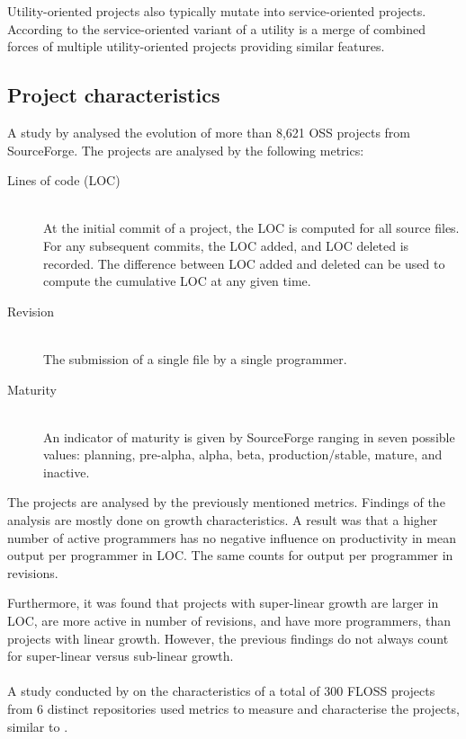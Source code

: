 Utility-oriented projects also typically mutate into service-oriented projects.
According to \citeauthor{nakakoji} the service-oriented variant of a utility is
a merge of combined forces of multiple utility-oriented projects providing
similar features.

\subsection{Project characteristics}
A study by \citet{koch2007} analysed the evolution of more than 8,621 OSS
projects from SourceForge. The projects are analysed by the following metrics:

\begin{description}
	\item[Lines of code (LOC)] \hfill \\ At the initial commit of a project,
		the LOC is computed for all source files. For any subsequent commits, the LOC
		added, and LOC deleted is recorded. The difference between LOC added and
		deleted can be used to compute the cumulative LOC at any given time.

	\item[Revision] \hfill \\ The submission of a single file by a single
		programmer.
		
	\item[Maturity] \hfill \\ An indicator of maturity is given by SourceForge
		ranging in seven possible values: planning, pre-alpha, alpha, beta,
		production/stable, mature, and inactive.
\end{description}

\noindent
The projects are analysed by the previously mentioned metrics. Findings of the
analysis are mostly done on growth characteristics. A result was that a higher
number of active programmers has no negative influence on productivity in mean
output per programmer in LOC. The same counts for output per programmer in
revisions.

Furthermore, it was found that projects with super-linear growth are larger in
LOC, are more active in number of revisions, and have more programmers, than
projects with linear growth. However, the previous findings do not always count
for super-linear versus sub-linear growth.

\paragraph{}
A study conducted by \citet{beecher} on the characteristics of a total of
300 FLOSS projects from 6 distinct repositories used metrics to measure
and characterise the projects, similar to \citet{koch2007}.

